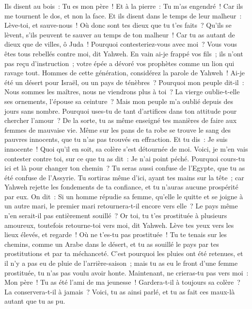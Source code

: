 \begin{multicols}{2}
Ils disent au bois~: Tu es mon père~! Et à la pierre~: Tu m'as engendré~! Car ils me tournent le dos, et non la face. Et ils disent dans le temps de leur malheur~: Lève-toi, et sauve-nous~!
Où donc sont tes dieux que tu t'es faits~? Qu'ils se lèvent, s'ils peuvent te sauver au temps de ton malheur~! Car tu as autant de dieux que de villes, ô Juda~!
Pourquoi contesteriez-vous avec moi~? Vous vous êtes tous rebellés contre moi, dit Yahweh.
En vain ai-je frappé vos fils~; ils n'ont pas reçu d'instruction~; votre épée a dévoré vos prophètes comme un lion qui ravage tout.
Hommes de cette génération, considérez la parole de Yahweh~! Ai-je été un désert pour Israël, ou un pays de ténèbres~? Pourquoi mon peuple dit-il~: Nous sommes les maîtres, nous ne viendrons plus à toi~?
La vierge oublie-t-elle ses ornements, l'épouse sa ceinture~? Mais mon peuple m'a oublié depuis des jours sans nombre.
Pourquoi uses-tu de tant d'artifices dans ton attitude pour chercher l'amour~? De la sorte, tu as même enseigné tes manières de faire aux femmes de mauvaise vie.
Même sur les pans de ta robe se trouve le sang des pauvres innocents, que tu n'as pas trouvés en effraction.
Et tu dis~: Je suis innocente~! Quoi qu'il en soit, sa colère s'est détournée de moi. Voici, je m'en vais contester contre toi, sur ce que tu as dit~: Je n'ai point péché.
Pourquoi cours-tu ici et là pour changer ton chemin~? Tu seras aussi confuse de l'Egypte, que tu as été confuse de l'Assyrie.
Tu sortiras même d'ici, ayant tes mains sur la tête~; car Yahweh rejette les fondements de ta confiance, et tu n'auras aucune prospérité par eux.
\VerseOne{}On dit~: Si un homme répudie sa femme, qu'elle le quitte et se joigne à un autre mari, le premier mari retournera-t-il encore vers elle~? Le pays même n'en serait-il pas entièrement souillé~? Or toi, tu t'es prostituée à plusieurs amoureux, toutefois retourne-toi vers moi, dit Yahweh.
Lève tes yeux vers les lieux élevés, et regarde~! Où ne t'es-tu pas prostituée~! Tu te tenais sur les chemins, comme un Arabe dans le désert, et tu as souillé le pays par tes prostitutions et par ta méchanceté.
C'est pourquoi les pluies ont été retenues, et il n'y a pas eu de pluie de l'arrière-saison~; mais tu as eu le front d'une femme prostituée, tu n'as pas voulu avoir honte.
Maintenant, ne crieras-tu pas vers moi~: Mon père~! Tu as été l'ami de ma jeunesse~!
Gardera-t-il à toujours sa colère~? La conservera-t-il à jamais~? Voici, tu as ainsi parlé, et tu as fait ces maux-là autant que tu as pu.

\end{multicols}
